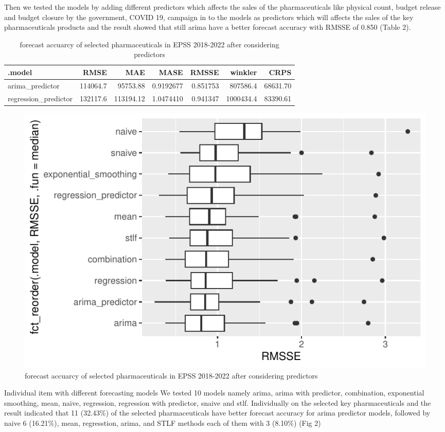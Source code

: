 \documentclass[
  authoryear,
  preprint,
  3p]{elsarticle}
\begin{document}
Then we tested the models by adding different predictors which affects
the sales of the pharmaceuticals like physical count, budget release and
budget closure by the government, COVID 19, campaign in to the models as
predictors which will affects the sales of the key pharmaceuticals
products and the result showed that still arima have a better forecast
accuracy with RMSSE of 0.850 (Table 2).

\begin{table}[!h]
\caption{forecast accuarcy of selected pharmaceuticals in EPSS 2018-2022 after
considering predictors}\tabularnewline

\centering
\begin{tabular}[t]{lrrrrrr}
\toprule
.model & RMSE & MAE & MASE & RMSSE & winkler & CRPS\\
\midrule
arima_predictor & 114064.7 & 95753.88 & 0.9192677 & 0.851753 & 807586.4 & 68631.70\\
regression_predictor & 132117.6 & 113194.12 & 1.0474410 & 0.941347 & 1000434.4 & 83390.61\\
\bottomrule
\end{tabular}
\end{table}

\begin{figure}

{\centering \includegraphics{main_files/figure-pdf/result2-1.pdf}

}

\caption{forecast accuarcy of selected pharmaceuticals in EPSS 2018-2022
after considering predictors}

\end{figure}

Individual item with different forecasting models We tested 10 models
namely arima, arima with predictor, combination, exponential smoothing,
mean, naive, regression, regression with predictor, snaive and stlf.
Individually on the selected key pharmaceuticals and the result
indicated that 11 (32.43\%) of the selected pharmaceuticals have better
forecast accuracy for arima predictor models, followed by naive 6
(16.21\%), mean, regresstion, arima, and STLF methods each of them with
3 (8.10\%) (Fig 2)
\end{document}
